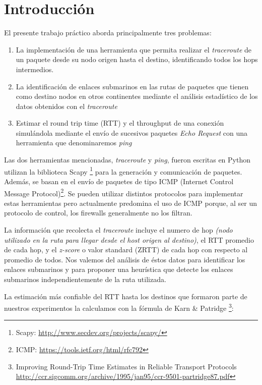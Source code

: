 \section{Introducción}
El presente trabajo práctico aborda principalmente tres problemas:
\begin{enumerate}
  \item La implementación de una herramienta que permita realizar el \textit{traceroute} de un paquete
  desde su nodo origen hasta el destino, identificando todos los hops intermedios.
  \item La identificación de enlaces submarinos en las rutas de paquetes que tienen como destino
  nodos en otros continentes mediante el análisis estadístico de los datos obtenidos con el \textit{traceroute}
  \item Estimar el round trip time (RTT) y el throughput de una conexión simulándola mediante el envío de 
  sucesivos paquetes \textit{Echo Request} con una herramienta que denominaremos \textit{ping}
\end{enumerate}

Las dos herramientas mencionadas, \textit{traceroute} y \textit{ping}, fueron 
escritas en Python utilizan la biblioteca Scapy \footnote{Scapy: \url{http://www.secdev.org/projects/scapy/}} para la generación y comunicación 
de paquetes. Además, se basan en el envío de paquetes de tipo ICMP (Internet Control Message Protocol)\footnote{ICMP: \url{https://tools.ietf.org/html/rfc792}}.
 Se pueden utilizar distintos protocolos para implementar estas herramientas
pero actualmente predomina el uso de ICMP porque, al ser un protocolo de control,
los firewalls generalmente no los filtran.\par

La información que recolecta el \textit{traceroute} incluye el numero de hop \textit{(nodo utilizado en la ruta para llegar desde el host origen al destino)}, el RTT promedio de cada hop, y el \textit{z-score} o valor standard (ZRTT) de cada hop
con respecto al promedio de todos. Nos valemos del análisis de éstos datos para identificar los enlaces submarinos y para proponer una heurística que detecte los enlaces submarinos independientemente de la ruta utilizada.

La estimación más confiable del RTT hasta los destinos que formaron parte de nuestros experimentos la calculamos con la fórmula de Karn \& Patridge 
\footnote{Improving Round-Trip Time Estimates in Reliable Transport Protocols \url{http://ccr.sigcomm.org/archive/1995/jan95/ccr-9501-partridge87.pdf}}:

